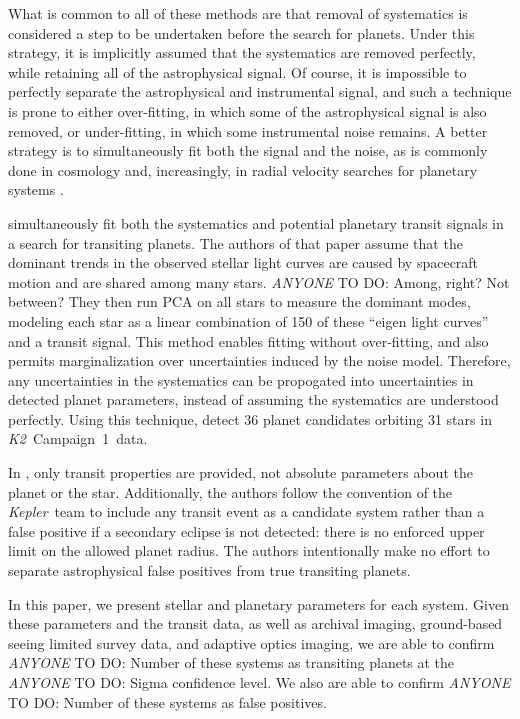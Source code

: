 \documentclass{emulateapj}
\newcommand{\project}[1]{\textsl{#1}}
\newcommand{\kep}{\project{Kepler}}
\newcommand{\KT}{\project{K2}}
\newcommand{\Ci}{Campaign~1}
\newcommand{\paperit}{\citet{Foreman-Mackey15}}
\newcommand{\todo}[3]{{\color{#2} \emph{#1} TO DO: #3}}
\newcommand{\anytodo}[1]{\todo{ANYONE}{NavyBlue}{#1}}
\begin{document}
What is common to all of these methods are that removal of systematics is considered a 
step to be undertaken before the search for planets. 
Under this strategy, it is implicitly assumed that the systematics are removed perfectly,
while retaining all of the astrophysical signal. 
Of course, it is impossible to perfectly separate the astrophysical and instrumental 
signal, and such a technique is prone to either over-fitting, in which some of the 
astrophysical signal is also removed, or under-fitting, in which some instrumental noise
remains.
A better strategy is to simultaneously fit both the signal and the noise, as is commonly
done in cosmology and, increasingly, in radial velocity searches for planetary systems
\citep[e.g.][]{Ferreira00, Boisse11, Haywood14, Grunblatt15}. 

\paperit{} simultaneously fit both the systematics and potential planetary transit signals
in a search for transiting planets. 
The authors of that paper assume that the dominant trends in the observed stellar light
curves are caused by spacecraft motion and are shared among many stars. \anytodo{Among,
right? Not between?}
They then run PCA on all stars to measure the dominant modes, modeling each star as a 
linear combination of 150 of these ``eigen light curves'' and a transit signal.
This method enables fitting without over-fitting, and also permits marginalization over
uncertainties induced by the noise model.
Therefore, any uncertainties in the systematics can be propogated into uncertainties in
detected planet parameters, instead of assuming the systematics are understood perfectly.
Using this technique, \paperit{} detect 36 planet candidates orbiting 31 stars in \KT\
\Ci\ data.

In \paperit, only transit properties are provided, not absolute parameters about the
planet or the star. 
Additionally, the authors follow the convention of the \kep\ team to include any
transit event as a candidate system rather than a false positive if a secondary eclipse
is not detected: there is no enforced upper limit on the allowed planet radius.
The authors intentionally make no effort to separate astrophysical false positives from
true transiting planets.

In this paper, we present stellar and planetary parameters for each system.
Given these parameters and the transit data, as well as archival imaging, ground-based
seeing limited survey data, and adaptive optics imaging, we are able to confirm 
\anytodo{Number} of these systems as transiting planets at the \anytodo{Sigma} confidence
level. We also are able to confirm \anytodo{Number} of these systems as false positives.
\end{document}
